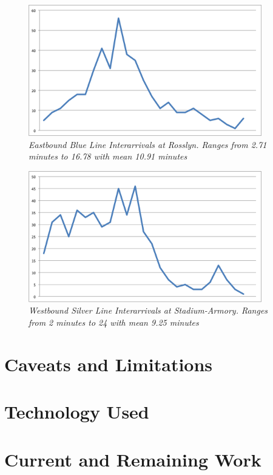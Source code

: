 \documentclass[a4paper,12pt]{article}
\begin{document}
\begin{figure}
\begin{center}
\includegraphics[width=4in]{../images/train_interarrivals/eastbound_blue_interarrivals.png}
\caption{\small \sl Eastbound Blue Line Interarrivals at Rosslyn. Ranges from 2.71 minutes to 16.78 with mean 10.91 minutes \label{fig:eastboundblueinterarrivals}}
\end{center}
\end{figure}

\begin{figure}
\begin{center}
\includegraphics[width=4in]{../images/train_interarrivals/westbound_silver_interarrivals.png}
\caption{\small \sl Westbound Silver Line Interarrivals at Stadium-Armory. Ranges from 2 minutes to 24 with mean 9.25 minutes \label{fig:westboundsilverinterarrivals}}
\end{center}
\end{figure}


\section{Caveats and Limitations}

\section{Technology Used}

\section{Current and Remaining Work}



\end{document}
